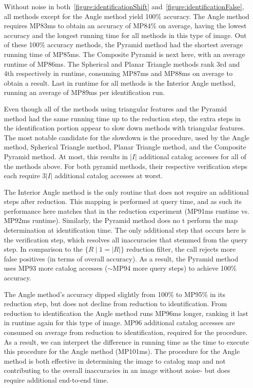 Without noise in both~\autoref{figure:identificationShift} and~\autoref{figure:identificationFalse}, all methods except
for the Angle method yield 100\% accuracy.
The Angle method requires MP83ms to obtain an accuracy of MP84\% on average, having the lowest accuracy and the longest
running time for all methods in this type of image.
Out of these 100\% accuracy methods, the Pyramid method had the shortest average running time of MP85ms.
The Composite Pyramid is next here, with an average runtime of MP86ms.
The Spherical and Planar Triangle methods rank 3rd and 4th respectively in runtime, consuming MP87ms and MP88ms on
average to obtain a result.
Last in runtime for all methods is the Interior Angle method, running an average of MP89ms per identification run.

Even though all of the methods using triangular features and the Pyramid method had the same running time up to the
reduction step, the extra steps in the identification portion appear to slow down methods with triangular features.
The most notable candidate for the slowdown is the  procedure, used by the Angle method, Spherical Triangle
method, Planar Triangle method, and the Composite Pyramid method.
At most, this results in $|I|$ additional catalog accesses for all of the methods above.
For both pyramid methods, their respective verification steps each require $3|I|$ additional catalog accesses at worst.

The Interior Angle method is the only routine that does not require an additional steps after reduction.
This mapping is performed at query time, and as such its performance here matches that in the reduction experiment
(MP91ms runtime vs. MP92ms runtime).
Similarly, the Pyramid method does no t perform the map determination at identification time.
The only additional step that occurs here is the verification step, which resolves all inaccuracies that stemmed
from the query step.
In comparison to the $\{ R \mid 1 = |R|\}$ reduction filter, the  call rejects more false positives
(in terms of overall accuracy).
As a result, the Pyramid method uses MP93 more catalog accesses ($\sim$MP94 more query steps) to achieve 100\% accuracy.

The Angle method's accuracy dipped slightly from 100\% to MP95\% in its reduction step, but does not decline from
reduction to identification.
From reduction to identification the Angle method runs MP96ms longer, ranking it last in runtime again for this
type of image.
MP96 additional catalog accesses are consumed on average from reduction to identification, required for the
 procedure.
As a result, we can interpret the difference in running time as the time to execute this procedure for the Angle method
(MP101ms).
The  procedure for the Angle method is both effective in determining the image to catalog map and not
contributing to the overall inaccuracies in an image without noise- but does require additional end-to-end time.

